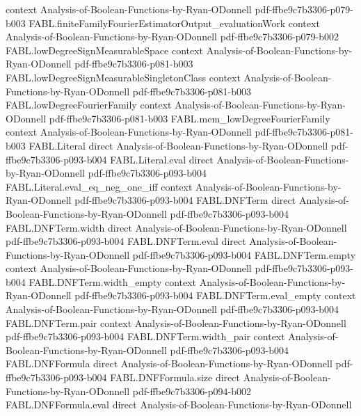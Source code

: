 \begin{theorem}
  {context}
  {Analysis-of-Boolean-Functions-by-Ryan-ODonnell}
  {pdf-ffbe9c7b3306-p079-b003}
\proofstep
  {FABL.finiteFamilyFourierEstimatorOutput_evaluationWork}
  {context}
  {Analysis-of-Boolean-Functions-by-Ryan-ODonnell}
  {pdf-ffbe9c7b3306-p079-b002}
\proofstep
  {FABL.lowDegreeSignMeasurableSpace}
  {context}
  {Analysis-of-Boolean-Functions-by-Ryan-ODonnell}
  {pdf-ffbe9c7b3306-p081-b003}
\proofstep
  {FABL.lowDegreeSignMeasurableSingletonClass}
  {context}
  {Analysis-of-Boolean-Functions-by-Ryan-ODonnell}
  {pdf-ffbe9c7b3306-p081-b003}
\proofstep
  {FABL.lowDegreeFourierFamily}
  {context}
  {Analysis-of-Boolean-Functions-by-Ryan-ODonnell}
  {pdf-ffbe9c7b3306-p081-b003}
\proofstep
  {FABL.mem_lowDegreeFourierFamily}
  {context}
  {Analysis-of-Boolean-Functions-by-Ryan-ODonnell}
  {pdf-ffbe9c7b3306-p081-b003}
\proofstep
  {FABL.Literal}
  {direct}
  {Analysis-of-Boolean-Functions-by-Ryan-ODonnell}
  {pdf-ffbe9c7b3306-p093-b004}
\proofstep
  {FABL.Literal.eval}
  {direct}
  {Analysis-of-Boolean-Functions-by-Ryan-ODonnell}
  {pdf-ffbe9c7b3306-p093-b004}
\proofstep
  {FABL.Literal.eval_eq_neg_one_iff}
  {context}
  {Analysis-of-Boolean-Functions-by-Ryan-ODonnell}
  {pdf-ffbe9c7b3306-p093-b004}
\proofstep
  {FABL.DNFTerm}
  {direct}
  {Analysis-of-Boolean-Functions-by-Ryan-ODonnell}
  {pdf-ffbe9c7b3306-p093-b004}
\proofstep
  {FABL.DNFTerm.width}
  {direct}
  {Analysis-of-Boolean-Functions-by-Ryan-ODonnell}
  {pdf-ffbe9c7b3306-p093-b004}
\proofstep
  {FABL.DNFTerm.eval}
  {direct}
  {Analysis-of-Boolean-Functions-by-Ryan-ODonnell}
  {pdf-ffbe9c7b3306-p093-b004}
\proofstep
  {FABL.DNFTerm.empty}
  {context}
  {Analysis-of-Boolean-Functions-by-Ryan-ODonnell}
  {pdf-ffbe9c7b3306-p093-b004}
\proofstep
  {FABL.DNFTerm.width_empty}
  {context}
  {Analysis-of-Boolean-Functions-by-Ryan-ODonnell}
  {pdf-ffbe9c7b3306-p093-b004}
\proofstep
  {FABL.DNFTerm.eval_empty}
  {context}
  {Analysis-of-Boolean-Functions-by-Ryan-ODonnell}
  {pdf-ffbe9c7b3306-p093-b004}
\proofstep
  {FABL.DNFTerm.pair}
  {context}
  {Analysis-of-Boolean-Functions-by-Ryan-ODonnell}
  {pdf-ffbe9c7b3306-p093-b004}
\proofstep
  {FABL.DNFTerm.width_pair}
  {context}
  {Analysis-of-Boolean-Functions-by-Ryan-ODonnell}
  {pdf-ffbe9c7b3306-p093-b004}
\proofstep
  {FABL.DNFFormula}
  {direct}
  {Analysis-of-Boolean-Functions-by-Ryan-ODonnell}
  {pdf-ffbe9c7b3306-p093-b004}
\proofstep
  {FABL.DNFFormula.size}
  {direct}
  {Analysis-of-Boolean-Functions-by-Ryan-ODonnell}
  {pdf-ffbe9c7b3306-p094-b002}
\proofstep
  {FABL.DNFFormula.eval}
  {direct}
  {Analysis-of-Boolean-Functions-by-Ryan-ODonnell}

\end{theorem}
